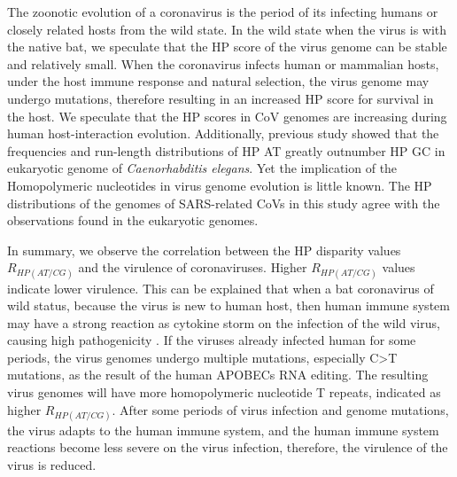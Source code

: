 \documentclass{article}
\numberwithin{equation}{section}
\begin{document}
The zoonotic evolution of a coronavirus is the period of its infecting humans or closely related hosts from the wild state. In the wild state when the virus is with the native bat, we speculate that the HP score of the virus genome can be stable and relatively small. When the coronavirus infects human or mammalian hosts, under the host immune response and natural selection, the virus genome may undergo mutations, therefore resulting in an increased HP score for survival in the host. We speculate that the HP scores in CoV genomes are increasing during human host-interaction evolution. Additionally, \cite{denver2004abundance} previous study showed that the frequencies and run-length distributions of HP AT greatly outnumber HP GC in eukaryotic genome of \textit{Caenorhabditis elegans}. Yet the implication of the Homopolymeric nucleotides in virus genome evolution is little known. The HP distributions of the genomes of SARS-related CoVs in this study agree with the observations found in the eukaryotic genomes.

In summary, we observe the correlation between the HP disparity values $R_{HP(AT/CG)}$ and the virulence of coronaviruses. Higher $R_{HP(AT/CG)}$ values indicate lower virulence. This can be explained that when a bat coronavirus of wild status, because the virus is new to human host, then human immune system may have a strong reaction as cytokine storm on the infection of the wild virus, causing high pathogenicity \citep{mehta2020covid}. If the viruses already infected human for some periods, the virus genomes undergo multiple mutations, especially C>T mutations, as the result of the human APOBECs RNA editing. The resulting virus genomes will have more homopolymeric nucleotide T repeats, indicated as higher $R_{HP(AT/CG)}$. After some periods of virus infection and genome mutations, the virus adapts to the human immune system, and the human immune system reactions become less severe on the virus infection, therefore, the virulence of the virus is reduced. 
\end{document}
